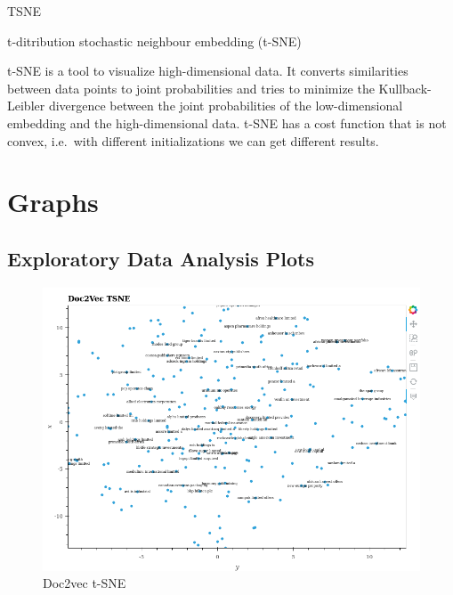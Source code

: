\documentclass[11pt]{article}
\makeatletter
\def\maxwidth{\ifdim\Gin@nat@width>\linewidth\linewidth
    \else\Gin@nat@width\fi}
\let\Oldincludegraphics\includegraphics
\renewcommand{\includegraphics}[1]{\Oldincludegraphics[width=.8\maxwidth]{#1}}
\makeatother
\begin{document}
TSNE

t-ditribution stochastic neighbour embedding (t-SNE)

t-SNE is a tool to visualize high-dimensional data. It converts
similarities between data points to joint probabilities and tries to
minimize the Kullback-Leibler divergence between the joint probabilities
of the low-dimensional embedding and the high-dimensional data. t-SNE
has a cost function that is not convex, i.e.~with different
initializations we can get different results.

\hypertarget{graphs}{%
\section{Graphs}\label{graphs}}

\hypertarget{exploratory-data-analysis-plots}{%
\subsection{Exploratory Data Analysis
Plots}\label{exploratory-data-analysis-plots}}

\begin{figure}
\centering
\includegraphics{../experiments/media/Doc2Vec TSNE.png}
\caption{Doc2vec t-SNE}
\end{figure}
\end{document}
